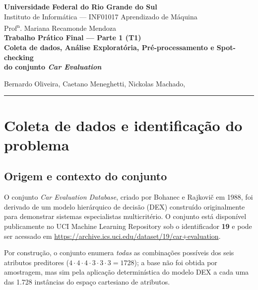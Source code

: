 \documentclass[11pt,a4paper]{article}
\begin{document}
\begin{center}
{\large\textbf{Universidade Federal do Rio Grande do Sul}}\\[2pt]
{\normalsize Instituto de Informática --- INF01017 Aprendizado de Máquina}\\[2pt]
{\normalsize Prof\textsuperscript{a}. Mariana Recamonde Mendoza}\\[16pt]

{\Large\bfseries Trabalho Prático Final --- Parte 1 (T1)}\\[6pt]
{\large\bfseries Coleta de dados, Análise Exploratória, Pré-processamento e Spot-checking \\
do conjunto \textit{Car Evaluation}}\\[15pt]

\begin{center}
  Bernardo Oliveira, Caetano Meneghetti, Nickolas Machado,
\end{center}

\end{center}

\vspace{6pt}\hrule\vspace{12pt}

\section{Coleta de dados e identificação do problema}

\subsection{Origem e contexto do conjunto}
O conjunto \emph{Car Evaluation Database}, criado por Bohanec e Rajkovi\v{c} em 1988, foi derivado de um modelo hierárquico de decisão (DEX) construído originalmente para demonstrar sistemas especialistas multicritério. O conjunto está disponível publicamente no UCI Machine Learning Repository sob o identificador \textbf{19} e pode ser acessado em \url{https://archive.ics.uci.edu/dataset/19/car+evaluation}.

Por construção, o conjunto enumera \emph{todas} as combinações possíveis dos seis atributos preditores ($4 \cdot 4 \cdot 4 \cdot 3 \cdot 3 \cdot 3 = 1728$); a base não foi obtida por amostragem, mas sim pela aplicação determinística do modelo DEX a cada uma das 1.728 instâncias do espaço cartesiano de atributos.
\end{document}
